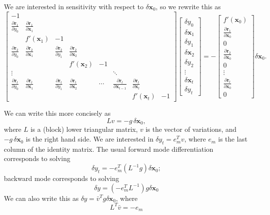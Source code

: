 \documentclass{article}
\newcommand{\bfx}{\mathbf{x}}
\newcommand{\bfr}{\mathbf{r}}
\begin{document}
We are interested in sensitivity with respect to $\delta \bfx_0$, so
we rewrite this as
\[
\begin{bmatrix}
  -1 \\
  \frac{\partial \bfr_1}{\partial y_0} &
  \frac{\partial \bfr_1}{\partial \bfx_1} \\
    & f'(\bfx_1) & -1 \\
  \frac{\partial \bfr_2}{\partial y_0} &
  \frac{\partial \bfr_2}{\partial \bfx_1} &
  \frac{\partial \bfr_2}{\partial y_1} &
  \frac{\partial \bfr_2}{\partial \bfx_2} \\
   &   &   & f'(\bfx_2) & -1 \\
  \vdots & & & & & \ddots \\
  \frac{\partial \bfr_t}{\partial y_0} &
  \frac{\partial \bfr_t}{\partial \bfx_1} &
  \frac{\partial \bfr_t}{\partial y_1} &
  \frac{\partial \bfr_t}{\partial \bfx_2} &
  \cdots &
  \frac{\partial \bfr_t}{\partial \bfx_{t-1}} &
  \frac{\partial \bfr_t}{\partial \bfx_t} \\
   &   &   & & & & f'(\bfx_t) & -1 
\end{bmatrix}
\begin{bmatrix}
  \delta y_0 \\
  \delta \bfx_1 \\ \delta y_1 \\
  \delta \bfx_2 \\ \delta y_2 \\
  \vdots \\
  \delta \bfx_t \\ \delta y_t
\end{bmatrix} = 
-\begin{bmatrix}
  f'(\bfx_0) \\
  \frac{\partial \bfr_1}{\partial \bfx_0} \\
  0 \\ 
  \frac{\partial \bfr_2}{\partial \bfx_0} \\
  0 \\
  \vdots \\
  \frac{\partial \bfr_t}{\partial \bfx_0} \\
  0
\end{bmatrix} \delta \bfx_0.
\]

We can write this more concisely as
\[
  L v = -g \, \delta \bfx_0,
\]
where $L$ is a (block) lower triangular matrix, $v$ is the vector of
variations, and $-g \, \delta \bfx_0$ is the right hand side.
We are interested in $\delta y_t = e_m^T v$, where $e_m$ is the last
column of the identity matrix.  The usual forward mode differentiation
corresponds to solving
\[
  \delta y_t = -e_m^T (L^{-1} g) \delta \bfx_0;
\]
backward mode corresponds to solving
\[
  \delta y = (-e_m^T L^{-1}) g \delta \bfx_0
\]
We can also write this as $\delta y = \bar{v}^T g\delta \bfx_0$, where
\[
  L^T \bar{v} = -e_m
\]
\end{document}
